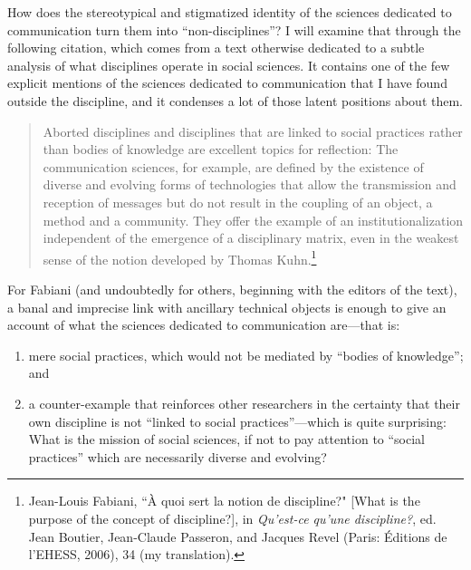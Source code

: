 \documentclass{tufte-handout}
\begin{document}
\noindent How does the stereotypical and stigmatized identity of the sciences
dedicated to communication turn them into ``non-disciplines''? I will
examine that through the following citation, which comes from a text
otherwise dedicated to a subtle analysis of what disciplines operate in
social sciences. It contains one of the few explicit mentions of the
sciences dedicated to communication that I have found outside the
discipline, and it condenses a lot of those latent positions about them.

\begin{quote}
Aborted disciplines and disciplines that are linked to social practices
rather than bodies of knowledge are excellent topics for reflection: The
communication sciences, for example, are defined by the existence of
diverse and evolving forms of technologies that allow the transmission
and reception of messages but do not result in the coupling of an
object, a method and a community. They offer the example of an
institutionalization independent of the emergence of a disciplinary
matrix, even in the weakest sense of the notion developed by Thomas
Kuhn.\footnote{Jean-Louis Fabiani, ``À quoi sert la notion de
  discipline?" {[}What is the purpose of the concept of discipline?{]},
  in \emph{Qu'est-ce qu'une discipline?}, ed. Jean Boutier, Jean-Claude
  Passeron, and Jacques Revel (Paris: Éditions de l'EHESS, 2006), 34 (my
  translation).}
\end{quote}

\noindent For Fabiani (and undoubtedly for others, beginning with the editors of
the text), a banal and imprecise link with ancillary technical objects
is enough to give an account of what the sciences dedicated to
communication are---that is:

\begin{enumerate}
\item
  mere social practices, which would not be mediated by ``bodies of
  knowledge''; and
\item
  a counter-example that reinforces other researchers in the certainty
  that their own discipline is not ``linked to social
  practices''---which is quite surprising: What is the mission of social
  sciences, if not to pay attention to ``social practices'' which are
  necessarily diverse and evolving?
\end{enumerate}
\end{document}
